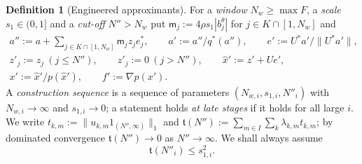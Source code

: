 \documentclass[10pt]{amsart}
\theoremstyle{definition}
\newtheorem{definition}[theorem]{Definition}
\theoremstyle{remark}
\begin{document}
\begin{definition}[Engineered approximants]\label{def:engineered}
For a \emph{window} $N_w\ge\max F$, a \emph{scale} $s_1\in(0,1]$ and a
\emph{cut-off} $N''>N_w$ put $\mathsf m_j:=4\rho s_1|b^\theta_j|$ for $j\in
K\cap[1,N_w]$ and
\begin{gather*}
 a'':=a+\sum_{j\in K\cap[1,N_w]}\mathsf m_jz_je_j^*,\qquad a':=a''/q^*(a''),\qquad
 e':=U^*a'/\|U^*a'\|,\\
 z'_j:=z_j\ (j\le N''),\qquad z'_j:=0\ (j>N''),\qquad \hat x':=z'+Ue',\\
 x':=\hat x'/p(\hat x'),\qquad f':=\nabla p(x').
\end{gather*}
A \emph{construction sequence} is a sequence of parameters
$(N_{w,i},s_{1,i},N''_i)$ with $N_{w,i}\to\infty$ and $s_{1,i}\to0$; a statement
holds \emph{at late stages} if it holds for all large $i$.  We write
$t_{k,m}:=\|u_{k,m}1_{(N'',\infty)}\|_1$ and
$\mathfrak t(N''):=\sum_{m\in I}\sum_k\lambda_{k,m}t_{k,m}$; by dominated convergence
$\mathfrak t(N'')\to0$ as $N''\to\infty$.  We shall always assume
\begin{equation}\label{eq:N1}
 \mathfrak t(N''_i)\le s_{1,i}^2 .
\end{equation}
\end{definition}
\end{document}
